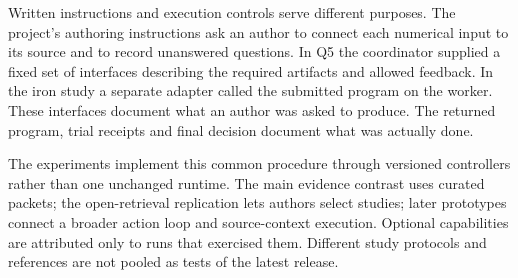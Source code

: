 \documentclass[11pt,letterpaper]{article}
\begin{document}
Written instructions and execution controls serve different purposes. The project's authoring instructions ask an author to connect each numerical input to its source and to record unanswered questions. In Q5 the coordinator supplied a fixed set of interfaces describing the required artifacts and allowed feedback. In the iron study a separate adapter called the submitted program on the worker. These interfaces document what an author was asked to produce. The returned program, trial receipts and final decision document what was actually done.


The experiments implement this common procedure through versioned controllers rather than one unchanged runtime. The main evidence contrast uses curated packets; the open-retrieval replication lets authors select studies; later prototypes connect a broader action loop and source-context execution. Optional capabilities are attributed only to runs that exercised them. Different study protocols and references are not pooled as tests of the latest release.


\FloatBarrier

\begingroup

\small

\renewcommand{\arraystretch}{1.22}
\end{document}
